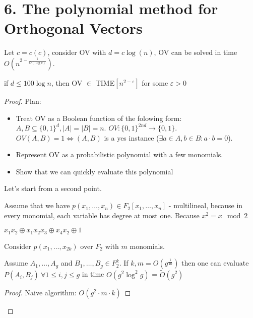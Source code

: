 
\section{6. The polynomial method for Orthogonal Vectors}

\begin{thm}
	Let $ c = c(c)$, consider OV with $d = c \log(n)$, OV can be solved in time $O(n^{2 - \frac{1}{O(\log c)}})$.
\end{thm}

\begin{prop*}
	if $d \leq 100 \log n$, then OV $\in$ TIME$[n^{2-\varepsilon}]$ for some $\varepsilon > 0$
\end{prop*}

\begin{proof}
	Plan:
	\begin{itemize}
		\item Treat OV as a Boolean function of the folowing form: $A, B \subseteq \{0, 1\}^d, |A| = |B| = n$.
			$OV : \{0, 1\}^{2nd} \to \{0, 1\}$.
			$OV(A, B) = 1 \Longleftrightarrow (A, B)$ is a yes instance ($\exists a \in A, b \in B : a \cdot b = 0$).

		\item Represent OV as a probabilistic polynomial with a few monomials.
		\item Show that we can quickly evaluate this polynomial
	\end{itemize}

	Let's start from a second point.

	\begin{remrk}
		Assume that we have $p(x_1, \dots, x_n) \in F_2[x_1, \dots, x_n]$ - multilineal, because in every monomial, each variable has degree at most one. Because $x^2 = x \mod 2$
	\end{remrk}

	\begin{exmpl}
		$x_1 x_2 \oplus x_1 x_2 x_3 \oplus x_4 x_2 \oplus 1$
	\end{exmpl}

	\begin{lm}
		Consider $p(x_1, \dots, x_{2k})$ over $F_2$ with $m$ monomials.

		Assume $A_1, \dots, A_g$ and $B_1, \dots, B_g \in F_2^k$.
		If $k, m = O(g^{\frac{1}{10}})$ then one can evaluate $P(A_i, B_j) \ \forall 1 \leq i, j \leq g$ in time $O(g^2 \log^2g)$ = $\widetilde{O}(g^2)$
	\end{lm}

	\begin{proof}
		Naive algorithm: $O(g^2 \cdot m \cdot k)$


\end{proof}
\end{proof}
